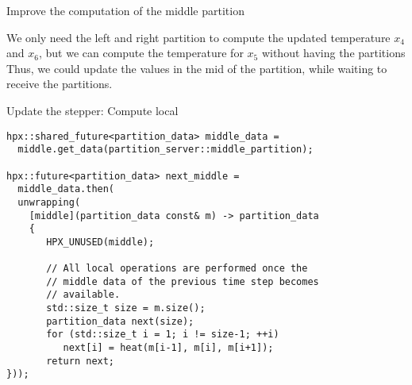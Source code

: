 \documentclass[12pt,t]{beamer}
\begin{document}
\begin{frame}{Improve the computation of the middle partition}

\begin{center}
\end{center}

We only need the left and right partition to compute the updated temperature $x_4$ and $x_6$, but we can compute the temperature for $x_5$ without having the partitions Thus, we could update the values in the mid of the partition, while waiting to receive the partitions.

\end{frame}

\begin{frame}[fragile]{Update the stepper: Compute local}

\begin{lstlisting}
hpx::shared_future<partition_data> middle_data =
  middle.get_data(partition_server::middle_partition);
  
hpx::future<partition_data> next_middle = 
  middle_data.then(
  unwrapping(
    [middle](partition_data const& m) -> partition_data
    {
       HPX_UNUSED(middle);

       // All local operations are performed once the 
       // middle data of the previous time step becomes 
       // available.
       std::size_t size = m.size();
       partition_data next(size);
       for (std::size_t i = 1; i != size-1; ++i)
          next[i] = heat(m[i-1], m[i], m[i+1]);
       return next;
}));
\end{lstlisting}

\end{frame}
\end{document}
